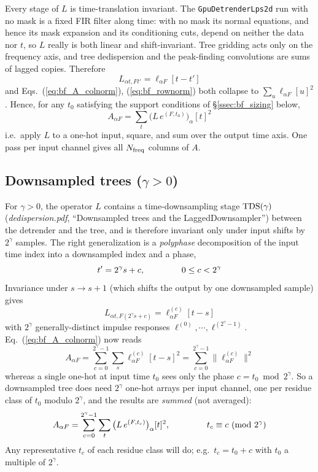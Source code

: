 \documentclass{article}
\numberwithin{equation}{section}   %
\def\TDS{{\rm TDS}}
\newcommand{\ddnotes}[1]{{\em dedispersion.pdf}, ``#1''}
\begin{document}
Every stage of $L$ is time-translation invariant. The {\tt GpuDetrenderLps2d} run with no mask is a fixed
FIR filter along time: with no mask its normal equations, and hence its mask expansion and its
conditioning cuts, depend on neither the data nor $t$, so $L$ really is both linear and
shift-invariant. Tree gridding acts only on the frequency axis, and tree dedispersion and the
peak-finding convolutions are sums of lagged copies. Therefore
\begin{equation}
L_{\alpha t, F t'} = \ell_{\alpha F}[t-t']
\end{equation}
and Eqs.\ (\ref{eq:bf_A_colnorm}), (\ref{eq:bf_rownorm}) both collapse to
$\sum_u \ell_{\alpha F}[u]^2$. Hence, for any $t_0$ satisfying the support conditions of
\S\ref{ssec:bf_sizing} below,
\begin{equation}
A_{\alpha F} = \sum_t \big( L \, e^{(F,t_0)} \big)_\alpha[t]^2
\label{eq:bf_master}
\end{equation}
i.e.\ apply $L$ to a one-hot input, square, and sum over the output time axis. One pass per input
channel gives all $N_{\rm freq}$ columns of $A$.

\subsection{Downsampled trees ($\gamma>0$)}

For $\gamma>0$, the operator $L$ contains a time-downsampling stage $\TDS(\gamma)$
(\ddnotes{Downsampled trees and the LaggedDownsampler}) between the detrender and the tree, and is therefore invariant
only under input shifts by $2^\gamma$ samples. The right generalization is a {\em polyphase}
decomposition of the input time index into a downsampled index and a phase,
\begin{equation}
t' = 2^\gamma s + c, \hspace{1.5cm} 0 \le c < 2^\gamma
\end{equation}
Invariance under $s \rightarrow s+1$ (which shifts the output by one downsampled sample) gives
\begin{equation}
L_{\alpha t, F(2^\gamma s + c)} = \ell^{(c)}_{\alpha F}[t-s]
\end{equation}
with $2^\gamma$ generally-distinct impulse responses $\ell^{(0)},\cdots,\ell^{(2^\gamma-1)}$.
Eq.\ (\ref{eq:bf_A_colnorm}) now reads
\begin{equation}
A_{\alpha F} = \sum_{c=0}^{2^\gamma-1} \sum_s \ell^{(c)}_{\alpha F}[t-s]^2
  = \sum_{c=0}^{2^\gamma-1} \big\| \ell^{(c)}_{\alpha F} \big\|^2
\end{equation}
whereas a single one-hot at input time $t_0$ sees only the phase $c = t_0 \bmod 2^\gamma$.
So a downsampled tree does need $2^\gamma$ one-hot arrays per input channel, one per residue class
of $t_0$ modulo $2^\gamma$, and the results are {\em summed} (not averaged):
\begin{equation}
A_{\alpha F} = \sum_{c=0}^{2^\gamma-1} \sum_t \big( L \, e^{(F,t_c)} \big)_\alpha[t]^2,
  \hspace{1.5cm} t_c \equiv c \ (\mbox{mod } 2^\gamma)
\label{eq:bf_master_ds}
\end{equation}
Any representative $t_c$ of each residue class will do; e.g.\ $t_c = t_0 + c$ with $t_0$ a multiple
of $2^\gamma$.
\end{document}

